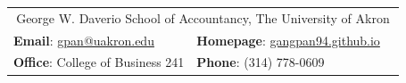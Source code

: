 \documentclass[letterpaper, 11pt]{article}
\begin{document}


\vspace{0.5cm} 
\begin{center}
\begin{tabular}{lll}
\multicolumn{3}{c}{George W. Daverio School of Accountancy, The University of Akron} \\
\textbf{Email}: \href{mailto:gpan@uakron.edu}{gpan@uakron.edu}      &
\hspace{0.41in} \textbf{Homepage}: \href{https://gangpan94.github.io/}{gangpan94.github.io}   & \\
\textbf{Office}: College of Business 241  &
\hspace{0.4in}  \textbf{Phone}: (314) 778-0609

\end{tabular}
\end{center}


\setlength{\tabcolsep}{5pt}
\end{document}
